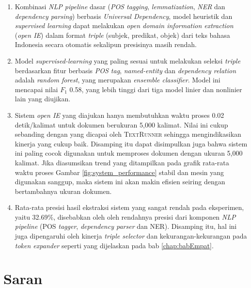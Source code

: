 \begin{enumerate}
	\item Kombinasi \textit{NLP pipeline} dasar (\textit{POS tagging}, \textit{lemmatization}, \textit{NER} dan \textit{dependency parsing}) berbasis \textit{Universal Dependency}, model heuristik dan \textit{supervised learning} dapat melakukan \textit{open domain information extraction} (\textit{open IE}) dalam format \textit{triple} (subjek, predikat, objek) dari teks bahasa Indonesia secara otomatis sekalipun presisinya masih rendah.
	
	\item Model \textit{supervised-learning} yang paling sesuai untuk melakukan seleksi \textit{triple} berdasarkan fitur berbasis \textit{POS tag}, \textit{named-entity} dan \textit{dependency relation} adalah \textit{random forest}, yang merupakan \textit{ensemble classifier}. Model ini mencapai nilai $F_1$ 0.58, yang lebih tinggi dari tiga model linier dan nonlinier lain yang diujikan.
	
	\item Sistem \textit{open IE} yang diajukan hanya membutuhkan waktu proses 0.02 detik/kalimat untuk dokumen berukuran 5,000 kalimat. Nilai ini cukup sebanding dengan yang dicapai oleh \textsc{TextRunner} \citep{banko2007open} sehingga mengindikasikan kinerja yang cukup baik. Disamping itu dapat disimpulkan juga bahwa sistem ini paling cocok digunakan untuk memproses dokumen dengan ukuran 5,000 kalimat. Jika diasumsikan trend yang ditampilkan pada grafik rata-rata waktu proses Gambar \ref{fig:system_performance} stabil dan mesin yang digunakan sanggup, maka sistem ini akan makin efisien seiring dengan bertambahnya ukuran dokumen.
	
	\item Rata-rata presisi hasil ekstraksi sistem yang sangat rendah pada eksperimen, yaitu 32.69\%, disebabkan oleh oleh rendahnya presisi dari komponen \textit{NLP pipeline} (POS \textit{tagger}, \textit{dependency parser} dan NER). Disamping itu, hal ini juga dipengaruhi oleh kinerja \textit{triple selector} dan kekurangan-kekurangan pada \textit{token expander} seperti yang dijelaskan pada bab \ref{chap:babEmpat}.
	
\end{enumerate}


\section{Saran}

